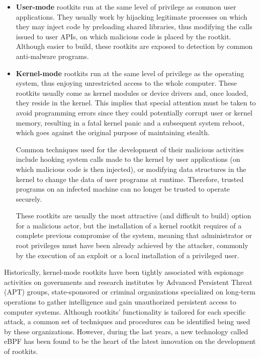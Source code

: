 \documentclass[12pt]{report} %
\begin{document}
\begin{itemize}
\item \textbf{User-mode} rootkits run at the same level of privilege as common user applications. They usually work by hijacking legitimate processes on which they may inject code by preloading shared libraries, thus modifying the calls issued to user APIs, on which malicious code is placed by the rootkit. Although easier to build, these rootkits are exposed to detection by common anti-malware programs.
\item \textbf{Kernel-mode} rootkits run at the same level of privilege as the operating system, thus enjoying unrestricted access to the whole computer. These rootkits usually come as kernel modules or device drivers and, once loaded, they reside in the kernel. This implies that special attention must be taken to avoid programming errors since they could potentially corrupt user or kernel memory, resulting in a fatal kernel panic and a subsequent system reboot, which goes against the original purpose of maintaining stealth.

Common techniques used for the development of their malicious activities include hooking system calls made to the kernel by user applications (on which malicious code is then injected), or modifying data structures in the kernel to change the data of user programs at runtime. Therefore, trusted programs on an infected machine can no longer be trusted to operate securely.

These rootkits are usually the most attractive (and difficult to build) option for a malicious actor, but the installation of a kernel rootkit requires of a complete previous compromise of the system, meaning that administrator or root privileges must have been already achieved by the attacker, commonly by the execution of an exploit or a local installation of a privileged user.
\end{itemize}

Historically, kernel-mode rootkits have been tightly associated with espionage activities on governments and research institutes by Advanced Persistent Threat (APT) groups\cite{rootkit_ptsecurity}, state-sponsored or criminal organizations specialized on long-term operations to gather intelligence and gain unauthorized persistent access to computer systems. Although rootkits' functionality is tailored for each specific attack, a common set of techniques and procedures can be identified being used by these organizations. However, during the last years, a new technology called eBPF has been found to be the heart of the latest innovation on the development of rootkits. 
\end{document}
